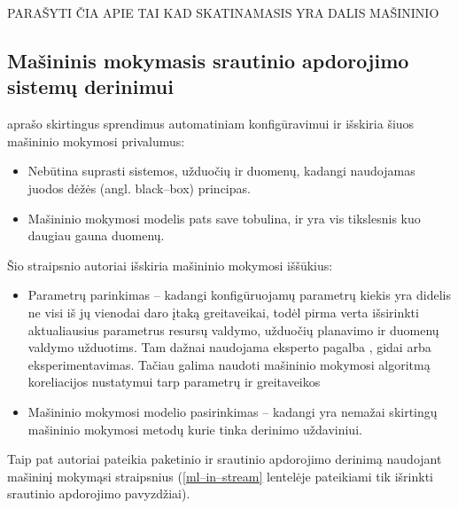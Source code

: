 \documentclass{VUMIFPSbakalaurinis}
\begin{document}
PARAŠYTI ČIA APIE TAI KAD SKATINAMASIS YRA DALIS MAŠININIO
\subsection{Mašininis mokymasis srautinio apdorojimo sistemų derinimui}

\cite{herodotou2020survey} aprašo skirtingus sprendimus automatiniam konfigūravimui ir išskiria šiuos mašininio mokymosi privalumus:
\begin{itemize}
    \item Nebūtina suprasti sistemos, užduočių ir duomenų, kadangi naudojamas juodos dėžės (angl. black–box) principas.
    \item Mašininio mokymosi modelis pats save tobulina, ir yra vis tikslesnis kuo daugiau gauna duomenų. 
\end{itemize}
Šio straipsnio autoriai išskiria mašininio mokymosi iššūkius: 
\begin{itemize}
    \item Parametrų parinkimas – kadangi konfigūruojamų parametrų kiekis yra didelis \cite{Bilal2017Towards, petridis2016spark} ne visi iš jų vienodai daro įtaką greitaveikai, todėl pirma verta išsirinkti aktualiausius parametrus resursų valdymo, užduočių planavimo ir duomenų valdymo užduotims. Tam dažnai naudojama eksperto pagalba \cite{wang2016novel}, gidai arba eksperimentavimas. Tačiau galima naudoti mašininio mokymosi algoritmą koreliacijos nustatymui tarp parametrų ir greitaveikos \cite{vaquero2018autotuning, yang2012statistics}
    \item Mašininio mokymosi modelio pasirinkimas – kadangi yra nemažai skirtingų mašininio mokymosi metodų kurie tinka derinimo uždaviniui.
\end{itemize} 
Taip pat autoriai pateikia paketinio ir srautinio apdorojimo derinimą naudojant mašininį mokymąsi straipsnius (\ref{ml–in–stream} lentelėje pateikiami tik išrinkti srautinio apdorojimo pavyzdžiai).
\end{document}
